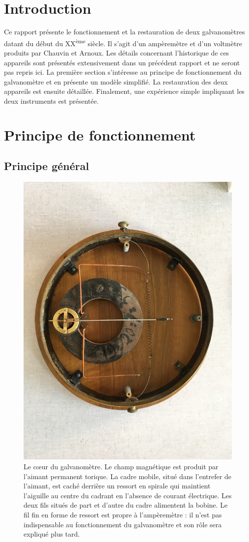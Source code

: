 \documentclass[12pt,a4paper,fleqn]{article}
\begin{document}

\newpage

\tableofcontents
\newpage



\section*{Introduction}

Ce rapport présente le fonctionnement et la restauration de deux galvanomètres datant du début du XX\textsuperscript{ème} siècle.
Il s'agit d'un ampèremètre et d'un voltmètre produits par Chauvin et Arnoux.
Les détails concernant l'historique de ces appareils sont présentés extensivement dans un précédent rapport \cite{Ardellier2016} et ne seront pas repris ici.
La première section s'intéresse au principe de fonctionnement du galvanomètre et en présente un modèle simplifié.
La restauration des deux appareils est ensuite détaillée.
Finalement, une expérience simple impliquant les deux instruments est présentée.


\section{Principe de fonctionnement}

\subsection{Principe général}

\begin{figure}[htbp]
    \center
    \includegraphics[trim=1300 300 1300 800, clip, width=.5\linewidth]{images/IMG_4037.JPG}
    \caption{
    Le \og cœur \fg{} du galvanomètre.
    Le champ magnétique est produit par l'aimant permanent torique.
    La cadre mobile, situé dans l'entrefer de l'aimant, est caché derrière un ressort en spirale qui maintient l'aiguille au centre du cadrant en l'absence de courant électrique.
    Les deux fils situés de part et d'autre du cadre alimentent la bobine.
    Le fil fin en forme de ressort est propre à l'ampèremètre : il n'est pas indispensable au fonctionnement du galvanomètre et son rôle sera expliqué plus tard.}
    \label{fig:principe}
\end{figure}
\end{document}
